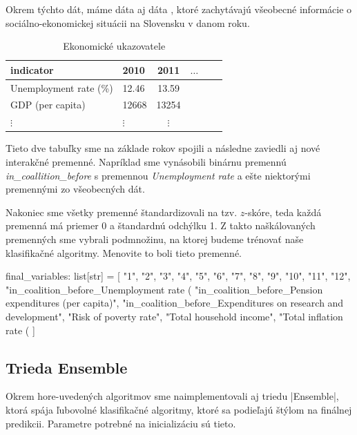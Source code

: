 \documentclass[main.tex]{subfiles}
\begin{document}
Okrem týchto  dát, máme dáta aj dáta , ktoré zachytávajú všeobecné informácie o sociálno-ekonomickej situácii na Slovensku v danom roku. 


\begin{table}[h!]
    \centering
    \caption{Ekonomické ukazovatele}
    \begin{tabular}{llcccl}
        \toprule
        \textbf{indicator} & \textbf{2010} & \textbf{2011} & $\ldots$ \\
        \midrule
        Unemployment rate (\%) & 12.46    & 13.59  \\
        GDP (per capita)       & 12668    & 13254 \\
        $\vdots$               & $\vdots$ & $\vdots$ \\ 
        \bottomrule
    \end{tabular}
\end{table}

Tieto dve tabuľky sme na základe rokov spojili a následne zaviedli aj nové interakčné premenné. Napríklad sme vynásobili binárnu premennú \textit{in\_coallition\_before} s premennou \textit{Unemployment rate} a ešte niektorými premennými zo všeobecných dát.

Nakoniec sme všetky premenné štandardizovali na tzv. $z$-skóre, teda každá premenná má priemer 0 a štandardnú odchýlku 1. Z takto naškálovaných premenných sme vybrali podmnožinu, na ktorej budeme trénovať naše klasifikačné algoritmy. Menovite to boli tieto premenné.

\begin{python}
    final_variables: list[str] = [
        "1", "2", "3", "4", "5", "6", "7", "8", "9", "10", "11", "12",
        "in_coalition_before_Unemployment rate (%
        "in_coalition_before_Pension expenditures (per capita)",
        "in_coalition_before_Expenditures on research and development",
        "Risk of poverty rate", "Total household income", 
        "Total inflation rate (%
    ]
\end{python}

\subsection{Trieda Ensemble}
Okrem hore-uvedených algoritmov sme naimplementovali aj triedu \pyth|Ensemble|, ktorá spája ľubovolné klasifikačné algoritmy, ktoré sa podieľajú štýlom  na finálnej predikcii. 
Parametre potrebné na inicializáciu sú tieto.
\end{document}
